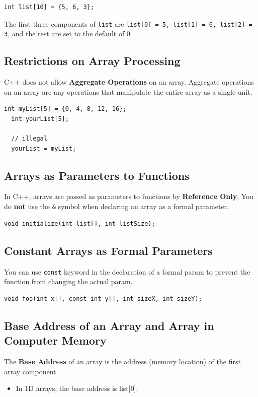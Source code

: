 \documentclass{article}
\begin{document}
\begin{lstlisting}[caption={Partial Array Initialization}]
  int list[10] = {5, 6, 3};
\end{lstlisting}

The first three components of \texttt{list} are \texttt{list[0] = 5, list[1] =
6, list[2] = 3}, and the rest are set to the default of 0.

\subsection{Restrictions on Array Processing}
C++ does not allow \textbf{Aggregate Operations} on an array. Aggregate
operations on an array are any operations that manipulate the entire array as a single unit.

\begin{lstlisting}[caption={Illegal Aggregate Operation on Array}]
  int myList[5] = {0, 4, 8, 12, 16};
  int yourList[5];

  // illegal
  yourList = myList;
\end{lstlisting}

\subsection{Arrays as Parameters to Functions}
In C++, arrays are passed as parameters to functions by \textbf{Reference Only}.
You do \textbf{not} use the \texttt{\&} symbol when declaring an array as a
formal parameter.

\begin{lstlisting}[caption={Arrays as Formal Parameters}]
  void initialize(int list[], int listSize);
\end{lstlisting}

\subsection{Constant Arrays as Formal Parameters}
You can use \texttt{const} keyword in the declaration of a formal param to
prevent the function from changing the actual param.

\begin{lstlisting}[caption={Constant Arrays as Formal Parameters}]
  void foo(int x[], const int y[], int sizeX, int sizeY);
\end{lstlisting}

\subsection{Base Address of an Array and Array in Computer Memory}
The \textbf{Base Address} of an array is the address (memory location) of the
first array component.
\begin{itemize}
  \item In 1D arrays, the base address is list[0];
\end{itemize}
\end{document}
